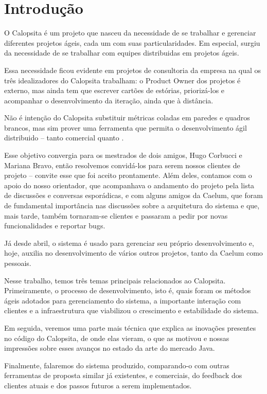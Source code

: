 \section{Introdução}
O Calopsita é um projeto que nasceu da necessidade de se trabalhar e gerenciar diferentes projetos ágeis, cada um com suas particularidades. Em especial, surgiu da necessidade de se trabalhar com equipes distribuidas em projetos ágeis. 

Essa necessidade ficou evidente em projetos de consultoria da empresa na qual os três idealizadores do Calopsita trabalham: o Product Owner dos projetos é externo, mas ainda tem que escrever cartões de estórias, priorizá-los e acompanhar o desenvolvimento da iteração, ainda que à distância.

Não é intenção do Calopsita substituir métricas coladas em paredes e quadros brancos, mas sim prover uma ferramenta que permita o desenvolvimento ágil distribuido -- tanto comercial quanto \opensource.  

Esse objetivo convergia para os mestrados de dois amigos, Hugo Corbucci e Mariana Bravo, então resolvemos convidá-los para serem nossos clientes de projeto -- convite esse que foi aceito prontamente. Além deles, contamos com o apoio do nosso orientador, que acompanhava o andamento do projeto pela lista de discussões e conversas esporádicas, e com alguns amigos da Caelum, que foram de fundamental importância nas discussões sobre a arquitetura do sistema e que, mais tarde, também tornaram-se clientes e passaram a pedir por novas funcionalidades e reportar bugs. 

Já desde abril, o sistema é usado para gerenciar seu próprio desenvolvimento e, hoje, auxilia no desenvolvimento de vários outros projetos, tanto da Caelum como pessoais.

Nesse trabalho, temos três temas principais relacionados ao Calopsita. Primeiramente, o processo de desenvolvimento, isto é, quais foram os métodos ágeis adotados para gerenciamento do sistema, a importante interação com clientes e a infraestrutura que viabilizou o crescimento e estabilidade do sistema. 

Em seguida, veremos uma parte mais técnica que explica as inovações presentes no código do Calopsita, de onde elas vieram, o que as motivou e nossas impressões sobre esses avanços no estado da arte do mercado Java.

Finalmente, falaremos do sistema produzido, comparando-o com outras ferramentas de proposta similar já existentes, \opensource e comerciais, do feedback dos clientes atuais e dos passos futuros a serem implementados.
